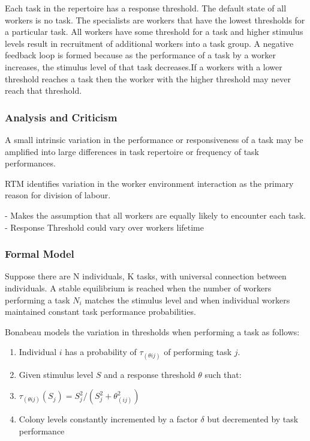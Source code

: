 Each task in the repertoire has a response threshold. The default state of all workers is no task. The specialists are workers that have the lowest thresholds for a particular task. All workers have some threshold for a task and higher stimulus levels result in recruitment of additional workers into a task group. A negative feedback loop is formed because as the performance of a task by a worker increases, the stimulus level of that task decreases.If a workers with a lower threshold reaches a task then the worker with the higher threshold may never reach that threshold. \cite{beshers2001models} %

\subsubsection{Analysis and Criticism}
A small intrinsic variation in the performance or responsiveness of a task may be amplified into large differences in task repertoire or frequency of task performances. 

RTM identifies variation in the worker environment interaction as the primary reason for division of labour.

- Makes the assumption that all workers are equally likely to encounter each task.  
- Response Threshold could vary over workers lifetime

\subsubsection{Formal Model}
Suppose there are N individuals, K tasks, with universal connection between individuals. 
A stable equilibrium is reached when the number of workers performing a task $N_i$ matches the stimulus level and when individual workers maintained constant task performance probabilities. \cite{page1990self}

Bonabeau models the variation in thresholds when performing a task as follows:
\begin{enumerate}
	\item Individual $i$ has a probability of $\tau_(\theta ij)$ of performing task $j$.
	\item Given stimulus level $S$ and a response threshold $\theta$ such that:
	\item $\tau_(\theta ij)(S_j) = S_j^2/(S_j^2 + \theta_(ij)^2)$
	\item Colony levels constantly incremented by a factor $\delta$ but decremented by task performance
\end{enumerate}

